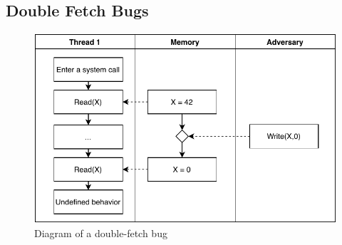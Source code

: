 \documentclass[conference]{IEEEtran}
\begin{document}
\subsection{Double Fetch Bugs}
\label{subsec:doublefetch}

\begin{figure}[]
  \centering
  \includegraphics[width=.85\linewidth]{img/doublefetch.pdf}
  \caption{Diagram of a double-fetch bug}
  \label{fig:doublefetch}
\end{figure}
\end{document}
